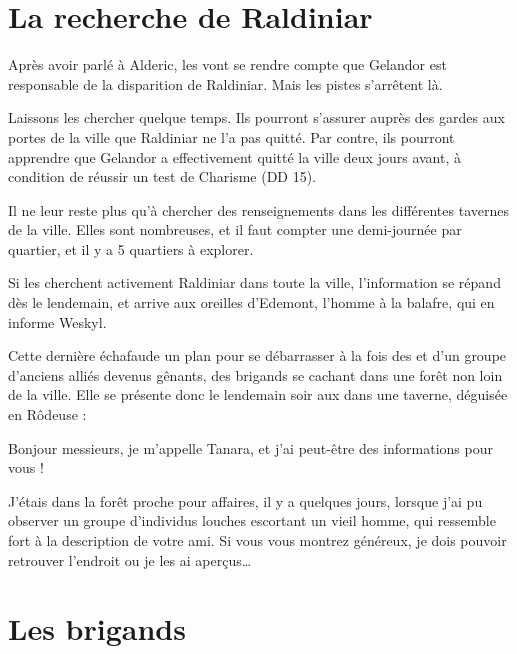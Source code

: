 \documentclass[a4paper,10pt,openany]{book}
\begin{document}
\begin{multicols}{2}
\section{La recherche de Raldiniar}
Après avoir parlé à Alderic, les \PJs vont se rendre compte que Gelandor est responsable de la disparition de Raldiniar. Mais les pistes s’arrêtent
là.\par Laissons les \PJs chercher quelque temps. Ils pourront s’assurer auprès des gardes aux portes de la ville que Raldiniar ne l’a pas quitté. Par
contre, ils pourront apprendre que Gelandor a effectivement quitté la ville deux jours avant, à condition de réussir un test de Charisme (DD 15).\par
Il ne leur reste plus qu’à chercher des renseignements dans les différentes tavernes de la ville. Elles sont nombreuses, et il faut compter une
demi-journée par quartier, et il y a 5 quartiers à explorer. \par Si les \PJs cherchent activement Raldiniar dans toute la ville, l’information se
répand dès le lendemain, et arrive aux oreilles d’Edemont, l’homme à la balafre, qui en informe Weskyl.\par Cette dernière échafaude un plan pour se
débarrasser à la fois des \PJs et d’un groupe d’anciens alliés devenus gênants, des brigands se cachant dans une forêt non loin de la ville. Elle se
présente donc le lendemain soir aux \PJs dans une taverne, déguisée en Rôdeuse :
\begin{paperbox}{ }
	Bonjour messieurs, je m’appelle Tanara, et j’ai peut-être des informations pour vous !\par
	J’étais dans la forêt proche pour affaires, il y a quelques jours, lorsque j’ai pu observer un groupe d’individus louches escortant un vieil homme,
	qui ressemble fort à la description de votre ami. Si vous vous montrez généreux, je dois pouvoir retrouver l’endroit ou je les ai aperçus\ldots
\end{paperbox}

\section{Les brigands}

\end{multicols}
\end{document}

